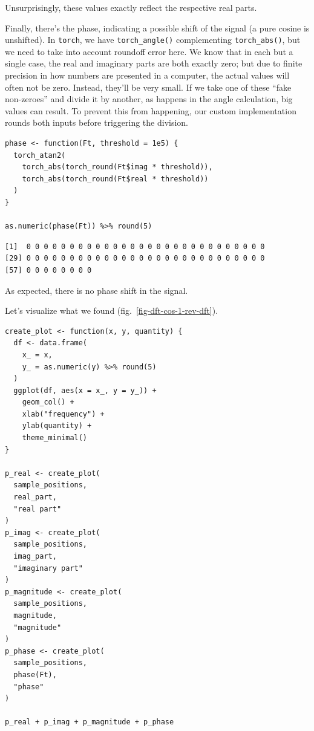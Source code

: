 \documentclass[
  letterpaper,
]{krantz}
\begin{document}
Unsurprisingly, these values exactly reflect the respective real parts.

Finally, there's the phase, indicating a possible shift of the signal (a
pure cosine is unshifted). In \texttt{torch}, we have
\texttt{torch\_angle()} complementing \texttt{torch\_abs()}, but we need
to take into account roundoff error here. We know that in each but a
single case, the real and imaginary parts are both exactly zero; but due
to finite precision in how numbers are presented in a computer, the
actual values will often not be zero. Instead, they'll be very small. If
we take one of these ``fake non-zeroes'' and divide it by another, as
happens in the angle calculation, big values can result. To prevent this
from happening, our custom implementation rounds both inputs before
triggering the division.

\begin{verbatim}
phase <- function(Ft, threshold = 1e5) {
  torch_atan2(
    torch_abs(torch_round(Ft$imag * threshold)),
    torch_abs(torch_round(Ft$real * threshold))
  )
}

as.numeric(phase(Ft)) %>% round(5)
\end{verbatim}

\begin{verbatim}
[1]  0 0 0 0 0 0 0 0 0 0 0 0 0 0 0 0 0 0 0 0 0 0 0 0 0 0 0 0
[29] 0 0 0 0 0 0 0 0 0 0 0 0 0 0 0 0 0 0 0 0 0 0 0 0 0 0 0 0
[57] 0 0 0 0 0 0 0 0
\end{verbatim}

As expected, there is no phase shift in the signal.

Let's visualize what we found (fig.~\ref{fig-dft-cos-1-rev-dft}).

\begin{verbatim}
create_plot <- function(x, y, quantity) {
  df <- data.frame(
    x_ = x,
    y_ = as.numeric(y) %>% round(5)
  )
  ggplot(df, aes(x = x_, y = y_)) +
    geom_col() +
    xlab("frequency") +
    ylab(quantity) +
    theme_minimal()
}

p_real <- create_plot(
  sample_positions,
  real_part,
  "real part"
)
p_imag <- create_plot(
  sample_positions,
  imag_part,
  "imaginary part"
)
p_magnitude <- create_plot(
  sample_positions,
  magnitude,
  "magnitude"
)
p_phase <- create_plot(
  sample_positions,
  phase(Ft),
  "phase"
)

p_real + p_imag + p_magnitude + p_phase
\end{verbatim}
\end{document}
